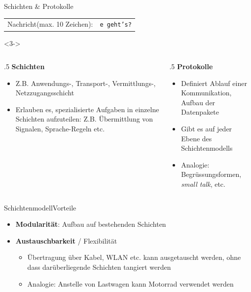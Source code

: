 \begin{frame}[fragile]{Schichten \& Protokolle}
{\begin{table}[H]
\begin{tabular}{p{2cm}l}
                \rowcolor{\applicationLayerColor!20}Nachricht\newline\tiny (max. 10 Zeichen): & \texttt{e geht's?}    \\
            \end{tabular}
        \end{table}
    }
    \pause
    \begin{onlyenv}<3->
    \begin{columns}[t]
        \begin{column}{.5\textwidth}
            \textbf{Schichten}
            \begin{itemize}[<+->]
                \item Z.B. Anwendungs-, Transport-, Vermittlungs-, Netzzugangsschicht
                \item Erlauben es, spezialisierte Aufgaben in einzelne Schichten aufzuteilen: Z.B. Übermittlung von Signalen, Sprache-Regeln etc.
            \end{itemize}
        \end{column}
        \pause
        \begin{column}{.5\textwidth}
            \textbf{Protokolle}
            \begin{itemize}[<+->]
                \item Definiert Ablauf einer Kommunikation, Aufbau der Datenpakete
                \item Gibt es auf jeder Ebene des Schichtenmodells
                \item Analogie: Begrüssungsformen, \textit{small talk}, etc.
            \end{itemize}
        \end{column}
    \end{columns}
    \end{onlyenv}
\end{frame}

\begin{frame}[fragile]{Schichtenmodell}{Vorteile}
    \begin{itemize}[<+->]
        \item \textbf{Modularität}: Aufbau auf bestehenden Schichten
        \item \textbf{Austauschbarkeit} / Flexibilität
              \begin{itemize}
                  \item Übertragung über Kabel, \acrshort{WLAN} etc. kann ausgetauscht werden, ohne dass darüberliegende Schichten tangiert werden
                  \item Analogie: Anstelle von Lastwagen kann Motorrad verwendet werden
              \end{itemize}
    \end{itemize}
\end{frame}


